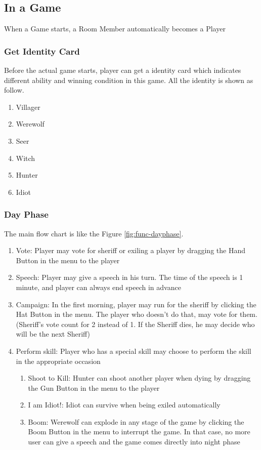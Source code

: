 \documentclass[11pt]{article}
\begin{document}
\subsection{In a Game}
When a Game starts, a Room Member automatically becomes a Player
\subsubsection{Get Identity Card}
Before the actual game starts, player can get a identity card which indicates different ability and winning condition in this game. All the identity is shown as follow.

\begin{enumerate}
\item
Villager
\item
Werewolf
\item
Seer
\item
Witch
\item
Hunter
\item
Idiot
\end{enumerate}

\subsubsection{Day Phase}
The main flow chart is like the Figure \ref{fig:func-dayphase}.

\begin{enumerate}
\item
Vote: Player may vote for sheriff or exiling a player by dragging the Hand Button in the menu to the player

\item
Speech: Player may give a speech in his turn. The time of the speech is 1 minute, and player can always end speech in advance

\item
Campaign: In the first morning, player may run for the sheriff by clicking the Hat Button in the menu. The player who doesn't do that, may vote for them. (Sheriff's vote count for 2 instead of 1. If the Sheriff dies, he may decide who will be the next Sheriff)

\item
Perform skill: Player who has a special skill may choose to perform the skill in the appropriate occasion

\begin{enumerate}
\item
Shoot to Kill: Hunter can shoot another player when dying by dragging the Gun Button in the menu to the player
\item
I am Idiot!: Idiot can survive when being exiled automatically
\item
Boom: Werewolf can explode in any stage of the game by clicking the Boom Button in the menu to interrupt the game. In that case, no more user can give a speech and the game comes directly into night phase
\end{enumerate}

\end{enumerate}
\end{document}

